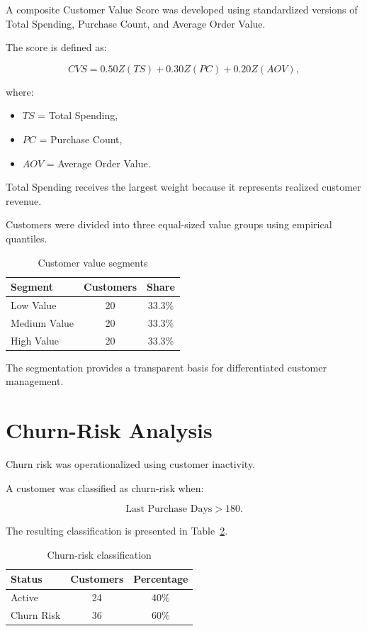 \documentclass[11pt,a4paper]{article}
\begin{document}
A composite Customer Value Score was developed using standardized versions of Total Spending, Purchase Count, and Average Order Value.

The score is defined as:

\[
CVS=
0.50Z(TS)
+
0.30Z(PC)
+
0.20Z(AOV),
\]

where:

\begin{itemize}
    \item $TS$ = Total Spending,
    \item $PC$ = Purchase Count,
    \item $AOV$ = Average Order Value.
\end{itemize}

Total Spending receives the largest weight because it represents realized customer revenue.

Customers were divided into three equal-sized value groups using empirical quantiles.

\begin{table}[H]
\centering
\caption{Customer value segments}
\label{tab:value_segments}
\begin{tabular}{lcc}
\toprule
\textbf{Segment} & \textbf{Customers} & \textbf{Share}\\
\midrule
Low Value & 20 & 33.3\%\\
Medium Value & 20 & 33.3\%\\
High Value & 20 & 33.3\%\\
\bottomrule
\end{tabular}
\end{table}

The segmentation provides a transparent basis for differentiated customer management.


\section{Churn-Risk Analysis}

Churn risk was operationalized using customer inactivity.

A customer was classified as churn-risk when:

\[
\text{Last Purchase Days}>180.
\]

The resulting classification is presented in Table~\ref{tab:churn}.

\begin{table}[H]
\centering
\caption{Churn-risk classification}
\label{tab:churn}
\begin{tabular}{lcc}
\toprule
\textbf{Status} & \textbf{Customers} & \textbf{Percentage}\\
\midrule
Active & 24 & 40\%\\
Churn Risk & 36 & 60\%\\
\bottomrule
\end{tabular}
\end{table}
\end{document}
